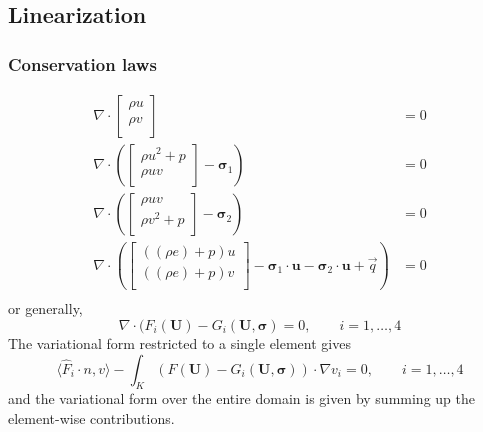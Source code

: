 \documentclass{article}
\newcommand{\grad}{\nabla}
\renewcommand{\div}{\grad \cdot}
\def\vecttwo#1#2{\left[
\begin{array}{c}
#1\\
#2\\
\end{array}
\right]}
\begin{document}
\subsection{Linearization}

\subsubsection{Conservation laws}

\begin{align*}
\div \vecttwo{\rho u }{\rho v} &= 0\\
\div \left(\vecttwo{\rho u^2+p }{\rho u v} - \boldsymbol \sigma_{1}\right) &=0\\
\div \left(\vecttwo{\rho u v}{\rho v^2+p } - \boldsymbol \sigma_{2}\right) &=0\\
\div \left(\vecttwo{((\rho e)+p)u}{((\rho e)+p)v} - \boldsymbol \sigma_1 \cdot \boldsymbol u- \boldsymbol \sigma_2 \cdot \boldsymbol u + \vec{q}\right) &=0\\
\end{align*}
or generally, 
\[
\div (F_i(\boldsymbol U)-G_i(\boldsymbol U,\boldsymbol \sigma) = 0, \qquad i = 1,\ldots, 4
\]
The variational form restricted to a single element gives
\[
\langle \widehat{F}_i\cdot n, v\rangle - \int_K  (F(\boldsymbol U)-G_i(\boldsymbol U,\boldsymbol \sigma)) \cdot \grad v_i = 0 , \qquad i = 1,\ldots, 4
\]
and the variational form over the entire domain is given by summing up the element-wise contributions. 
\end{document}

